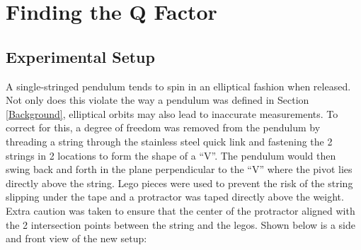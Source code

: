 \documentclass[12pt]{article}
\begin{document}
\newpage

\section{Finding the Q Factor} \label{Finding the Q Factor}

\subsection{Experimental Setup}
{\color{blue}
A single-stringed pendulum tends to spin in an elliptical fashion when released. Not only does this violate the way a pendulum was defined in Section \ref{Background}, elliptical orbits may also lead to inaccurate measurements. To correct for this,} a degree of freedom was removed from the pendulum by threading a string through the stainless steel quick link and fastening the 2 strings in 2 locations to form the shape of a ``V''. The pendulum would then swing back and forth in the plane perpendicular to the ``V'' {\color{blue} where the pivot lies directly above the string. Lego pieces were used to prevent the risk of the string slipping under the tape and a protractor was taped directly above the weight. Extra caution was taken to ensure that the center of the protractor aligned with the 2 intersection points between the string and the legos. Shown below is a side and front view of the new setup:}
\end{document}
